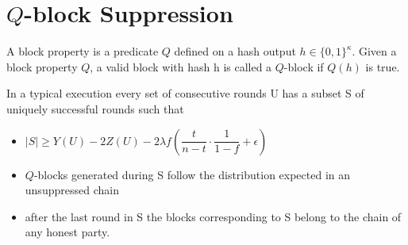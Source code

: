 \section{$Q$-block Suppression}
\begin{definition}
    \cite{dionyziz}
    A block property is a predicate $Q$ defined on a hash output $h \in \{ 0, 1 \}^\kappa$. Given  a block property $Q$, a valid block with hash h is called a $Q$-block if $Q(h)$ is true.
\end{definition}

\begin{lemma}[Unsuppressibility]\cite{dionyziz}
    In a typical execution every set of consecutive rounds U has a subset S of uniquely successful rounds such that
    \begin{itemize}
        \item $\lvert S \rvert \geq Y(U) - 2Z(U) - 2 \lambda f (\dfrac{t}{n-t} \cdot \dfrac{1}{1-f} + \epsilon)$
        \item $Q$-blocks generated during S follow the distribution expected in an unsuppressed chain
        \item after the last round in S the blocks corresponding to S belong to the chain of any honest party.
    \end{itemize}
\end{lemma}


